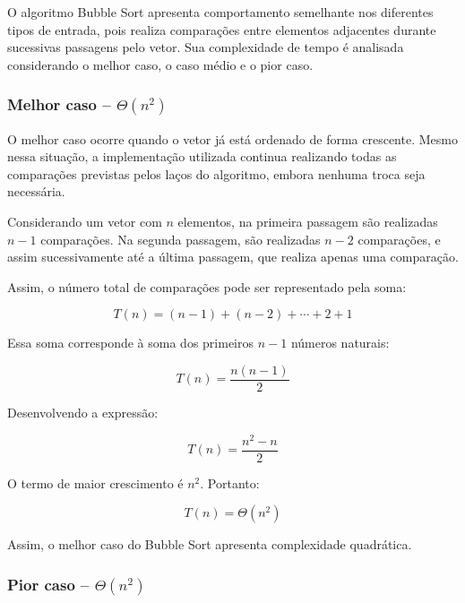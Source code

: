 O algoritmo Bubble Sort apresenta comportamento semelhante nos diferentes
tipos de entrada, pois realiza comparações entre elementos adjacentes
durante sucessivas passagens pelo vetor. Sua complexidade de tempo é
analisada considerando o melhor caso, o caso médio e o pior caso.

\subsubsection{Melhor caso -- \texorpdfstring{$\Theta(n^2)$}{Theta(n²)}}

O melhor caso ocorre quando o vetor já está ordenado de forma crescente.
Mesmo nessa situação, a implementação utilizada continua realizando todas
as comparações previstas pelos laços do algoritmo, embora nenhuma troca
seja necessária.

Considerando um vetor com $n$ elementos, na primeira passagem são
realizadas $n-1$ comparações. Na segunda passagem, são realizadas $n-2$
comparações, e assim sucessivamente até a última passagem, que realiza
apenas uma comparação.

Assim, o número total de comparações pode ser representado pela soma:

\begin{equation}
T(n) = (n-1) + (n-2) + \cdots + 2 + 1
\end{equation}

Essa soma corresponde à soma dos primeiros $n-1$ números naturais:

\begin{equation}
T(n) = \frac{n(n-1)}{2}
\end{equation}

Desenvolvendo a expressão:

\begin{equation}
T(n) = \frac{n^2-n}{2}
\end{equation}

O termo de maior crescimento é $n^2$. Portanto:

\begin{equation}
T(n) = \Theta(n^2)
\end{equation}

Assim, o melhor caso do Bubble Sort apresenta complexidade quadrática.

\subsubsection{Pior caso -- \texorpdfstring{$\Theta(n^2)$}{Theta(n2)}}

